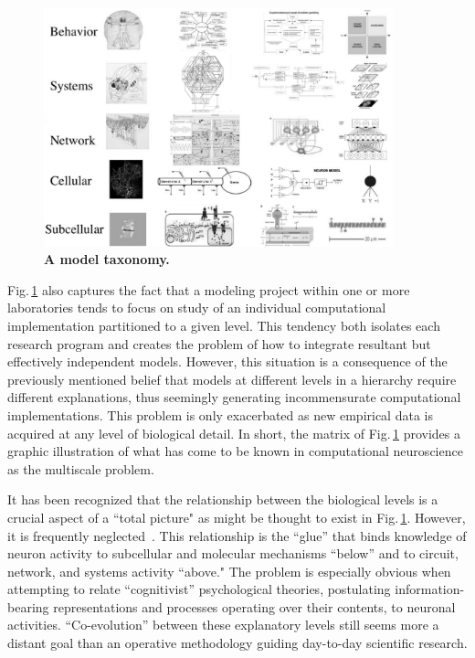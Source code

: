 \documentclass[10pt,letterpaper]{article}
\begin{document}
\begin{figure}[h!t]
  \begin{center}
    \includegraphics[width=0.9\textwidth]{figures/fig1-bw.png} %
  \end{center}
  \caption{ \small{\bf A model taxonomy.} }
  \label{fig1}
\end{figure}

Fig.\,\ref{fig1} also captures the fact that a modeling project within one or more laboratories tends to focus on study of an individual computational implementation partitioned to a given level. This tendency both isolates each research program and creates the problem of how to integrate resultant but effectively independent models. However, this situation is a consequence of the previously mentioned belief that models at different levels in a hierarchy require different explanations, thus seemingly generating incommensurate computational implementations. This problem is only exacerbated as new empirical data is acquired at any level of biological detail. In short, the matrix of Fig.\,\ref{fig1} provides a graphic illustration of what has come to be known in computational neuroscience as the multiscale problem.

It has been recognized that the relationship between the biological levels is a crucial aspect of a ``total picture" as might be thought to exist in Fig.\,\ref{fig1}. However, it is frequently neglected~\cite{bickle19}.  This relationship is the “glue” that binds knowledge of neuron activity to subcellular and molecular mechanisms “below” and to circuit, network, and systems activity “above." The problem is especially obvious when attempting to relate “cognitivist” psychological theories, postulating information-bearing representations and processes operating over their contents, to neuronal activities. “Co-evolution” between these explanatory levels still seems more a distant goal than an operative methodology guiding day-to-day scientific research.
\end{document}

